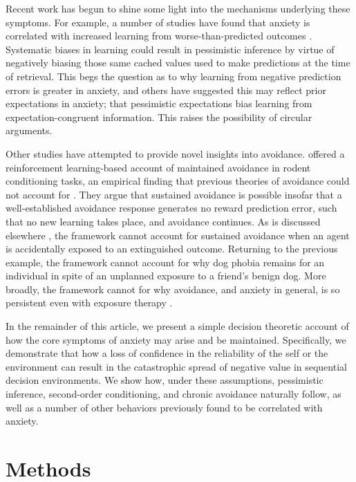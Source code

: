 \documentclass[11pt]{article} %
\begin{document}
Recent work has begun to shine some light into the mechanisms underlying these symptoms. For example, a number of studies have found that anxiety is correlated with increased learning from worse-than-predicted outcomes \citep{Harle2017, Garrett2018, Aylward2019}. Systematic biases in learning could result in pessimistic inference by virtue of negatively biasing those same cached values used to make predictions at the time of retrieval. This begs the question as to why learning from negative prediction errors is greater in anxiety, and others have suggested this may reflect prior expectations in anxiety; that pessimistic expectations bias learning from expectation-congruent information. This raises the possibility of circular arguments.

Other studies have attempted to provide novel insights into avoidance. \cite{Maia2010} offered a reinforcement learning-based account of maintained avoidance in rodent conditioning tasks, an empirical finding that previous theories of avoidance could not account for \citep{Krypotos2015}. They argue that sustained avoidance is possible insofar that a well-established avoidance response generates no reward prediction error, such that no new learning takes place, and avoidance continues. As is discussed elsewhere \citep{Moutoussis2017}, the framework cannot account for sustained avoidance when an agent is accidentally exposed to an extinguished outcome. Returning to the previous example, the framework cannot account for why dog phobia remains for an individual in spite of an unplanned exposure to a friend's benign dog. More broadly, the framework cannot for why avoidance, and anxiety in general, is so persistent even with exposure therapy \citep{Craske2014}.

In the remainder of this article, we present a simple decision theoretic account of how the core symptoms of anxiety may arise and be maintained. Specifically, we demonstrate that how a loss of confidence in the reliability of the self or the environment can result in the catastrophic spread of negative value in sequential decision environments. We show how, under these assumptions, pessimistic inference, second-order conditioning, and chronic avoidance naturally follow, as well as a number of other behaviors previously found to be correlated with anxiety.

\section{Methods}
\end{document}
